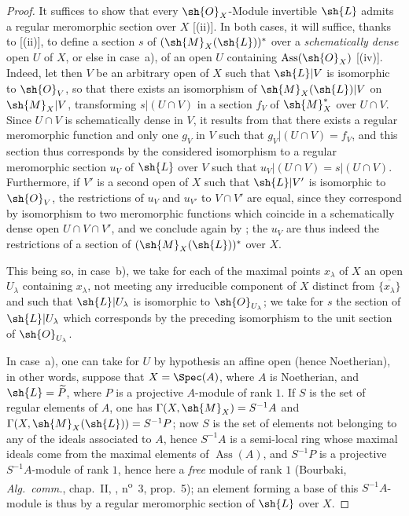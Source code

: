 \begin{proof}
It suffices to show that every $\sh{O}_X$-Module invertible $\sh{L}$ admits a regular meromorphic section over $X$ [(ii)].
In both cases, it will suffice, thanks to [(ii)], to define a section $s$ of $(\sh{M}_X(\sh{L}))^*$ over a \emph{schematically dense} open $U$ of $X$, or else in case~a), of an open $U$ containing $\operatorname{Ass}(\sh{O}_X)$ [(iv)].
Indeed, let then $V$ be an arbitrary open of $X$ such that $\sh{L}|V$ is isomorphic to $\sh{O}_V$, so that there exists an isomorphism of $\sh{M}_X(\sh{L})|V$ on $\sh{M}_X|V$, transforming $s|(U\cap V)$ in a section $f_V$ of $\sh{M}_X^*$ over $U\cap V$.
Since $U\cap V$ is schematically dense in $V$, it results from  that there exists a regular meromorphic function and only one $g_V$ in $V$ such that $g_V|(U\cap V)=f_V$, and this section thus corresponds by the considered isomorphism to a regular meromorphic section $u_V$ of $\sh{L}$ over $V$ such that $u_V|(U\cap V)=s|(U\cap V)$.
Furthermore, if $V'$ is a second open of $X$ such that $\sh{L}|V'$ is isomorphic to $\sh{O}_V$, the restrictions of $u_V$ and $u_{V'}$ to $V\cap V'$ are equal, since they correspond by isomorphism to two meromorphic functions which coincide in a schematically dense open $U\cap V\cap V'$, and we conclude again by ;
the $u_V$ are thus indeed the restrictions of a section of $(\sh{M}_X(\sh{L}))^*$ over $X$.

This being so, in case~b), we take for each of the maximal points $x_\lambda$ of $X$ an open $U_\lambda$ containing $x_\lambda$, not meeting any irreducible component of $X$ distinct from $\overline{\{x_\lambda\}}$ and such that $\sh{L}|U_\lambda$ is isomorphic to $\sh{O}_{U_\lambda}$;
we take for $s$ the section of $\sh{L}|U_\lambda$ which corresponds by the preceding isomorphism to the unit section of $\sh{O}_{U_\lambda}$.

In case~a), one can take for $U$ by hypothesis an affine open (hence Noetherian), in other words, suppose that $X=\Spec(A)$, where $A$ is Noetherian, and $\sh{L}=\widetilde{P}$, where $P$ is a projective $A$-module of rank $1$.
If $S$ is the set of regular elements of $A$, one has $\Gamma(X,\sh{M}_X)=S^{-1}A$  and $\Gamma(X,\sh{M}_X(\sh{L}))=S^{-1}P$;
now $S$ is the set of elements not belonging to any of the ideals associated to $A$, hence $S^{-1}A$ is a semi-local ring whose maximal ideals come from the maximal elements of $\operatorname{Ass}(A)$, and $S^{-1}P$ is a projective $S^{-1}A$-module of rank $1$, hence here a \emph{free} module of rank $1$ (Bourbaki, \emph{Alg.~comm.}, chap.~II, , n\textsuperscript{o}~3, prop.~5);
an element forming a base of this $S^{-1}A$-module is thus by  a regular meromorphic section of $\sh{L}$ over $X$.
\end{proof}

